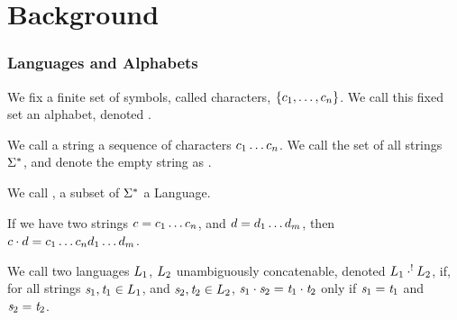 \section{Background}


\subsubsection{Languages and Alphabets}


\begin{definition}
We fix a finite set of symbols, called characters, $\{c_1,\ldots,c_n\}$.
We call this fixed set an alphabet, denoted \Alphabet{}.
\end{definition}

\begin{definition}
We call a string a sequence of characters $c_1\ldots c_n$.
We call the set of all strings $\Sigma^*$, and denote the empty string as \EmptyString{}.
\end{definition}

\begin{definition}
We call \Language{}, a subset of $\Sigma^*$ a Language.
\end{definition}

\begin{definition}
If we have two strings $c=c_1\ldots c_n$,
and $d=d_1\ldots d_m$,
then $c\cdot d=c_1\ldots c_nd_1\ldots d_m$.
\end{definition}

\begin{definition}
We call two languages $L_1$, $L_2$ unambiguously concatenable,
denoted $L_1 \cdot^! L_2$,
if, for all strings $\mathit{s}_1,\mathit{t}_1\in L_1$,
and $\mathit{s}_2,\mathit{t}_2\in L_2$,
$\mathit{s}_1\cdot\mathit{s}_2=\mathit{t}_1\cdot\mathit{t}_2$
only if $\mathit{s}_1=\mathit{t}_1$ and $\mathit{s}_2=\mathit{t}_2$.
\end{definition}

